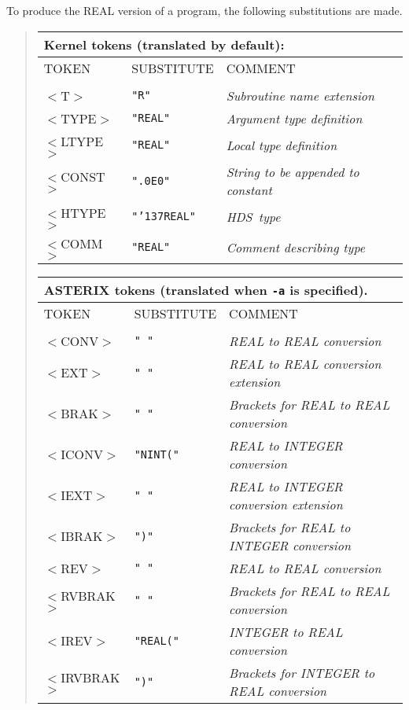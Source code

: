 \documentclass[twoside,11pt]{article}
\renewcommand{\_}{{\tt\char'137}}     %
\newcommand{\HDS}{{\footnotesize HDS}\normalsize}
\begin{document}
To produce the REAL version of a program, the following substitutions
are made.
\begin{quote}
\begin{tabular}{lll}
\multicolumn{3}{l}{\bf{Kernel} tokens (translated by default):}\\
\hline
TOKEN      &SUBSTITUTE      &COMMENT\\
\\
$<$T$>$     &{\tt "R"}     &{\em Subroutine name extension}\\
$<$TYPE$>$  &{\tt "REAL"}  &{\em Argument type definition}\\
$<$LTYPE$>$ &{\tt "REAL"}  &{\em Local type definition}\\
$<$CONST$>$ &{\tt ".0E0"}  &{\em String to be appended to constant}\\
$<$HTYPE$>$ &{\tt "\_REAL"} &{\em \HDS\ type}\\
$<$COMM$>$  &{\tt "REAL"}  &{\em Comment describing type}\\
\end{tabular}

\begin{tabular}{lll}
\multicolumn{3}{l}{\bf{ASTERIX} tokens (translated when {\tt -a} is specified).}\\
\hline
TOKEN      &SUBSTITUTE      &COMMENT\\
\\
$<$CONV$>$     &{\tt " "}     &{\em REAL to REAL conversion}\\
$<$EXT$>$      &{\tt " "}     &{\em REAL to REAL conversion extension}\\
$<$BRAK$>$     &{\tt " "}  &{\em Brackets for REAL to REAL conversion}\\
$<$ICONV$>$    &{\tt "NINT("} &{\em REAL to INTEGER conversion}\\
$<$IEXT$>$     &{\tt " "}  &{\em REAL to INTEGER conversion extension}\\
$<$IBRAK$>$    &{\tt ")"} &{\em Brackets for REAL to INTEGER conversion}\\
$<$REV$>$      &{\tt " "}     &{\em REAL to REAL conversion}\\
$<$RVBRAK$>$   &{\tt " "}   &{\em Brackets for REAL to REAL conversion}\\
$<$IREV$>$     &{\tt "REAL("} &{\em INTEGER to REAL conversion}\\
$<$IRVBRAK$>$  &{\tt ")"} &{\em Brackets for INTEGER to REAL conversion}\\
\end{tabular}
\end{quote}
\end{document}
